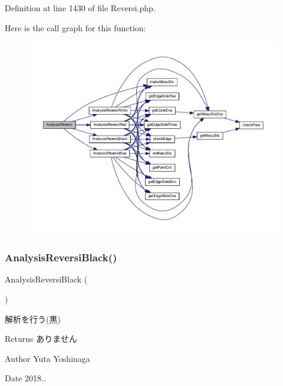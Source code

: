 Definition at line 1430 of file Reversi.\+php.

Here is the call graph for this function\+:\nopagebreak
\begin{figure}[H]
\begin{center}
\leavevmode
\includegraphics[width=350pt]{class_reversi_a1e2f4c432c1e407c4dbec20f4ee1b3b7_cgraph}
\end{center}
\end{figure}
\mbox{\label{class_reversi_a471972ec549188f7eb701d57e14ae7a1}} 
\subsubsection{\texorpdfstring{Analysis\+Reversi\+Black()}{AnalysisReversiBlack()}}
{\footnotesize\ttfamily Analysis\+Reversi\+Black (\begin{DoxyParamCaption}{ }\end{DoxyParamCaption})\hspace{0.3cm}{\ttfamily [private]}}



解析を行う(黒) 

\begin{DoxyReturn}{Returns}
ありません 
\end{DoxyReturn}
\begin{DoxyAuthor}{Author}
Yuta Yoshinaga 
\end{DoxyAuthor}
\begin{DoxyDate}{Date}
2018.. 
\end{DoxyDate}



